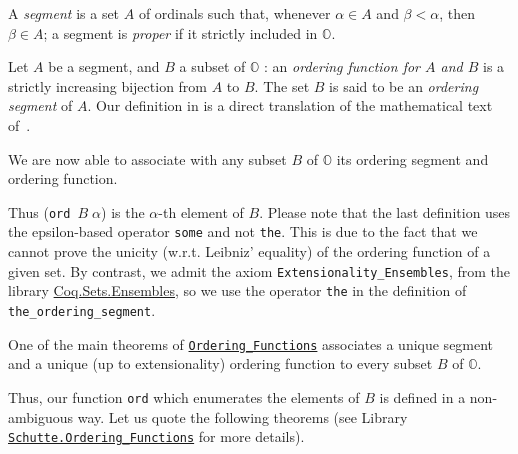 A \emph{segment} is a set $A$ of ordinals such that, whenever  $\alpha\in A$ and
$\beta<\alpha$, then $\beta\in A$; a segment is  \emph{proper} if it strictly included in $\mathbb{O}$.




Let  $A$ be a segment, and $B$ a subset of $\mathbb{O}$ : an \emph{ordering function for $A$ and  $B$} is a strictly increasing bijection from $A$ to $B$.
The set $B$ is said to be an \emph{ordering segment} of $A$.
Our definition in \coq{} is a direct translation of the mathematical text of~\cite{schutte}.




We are now able to associate with any subset $B$ of $\mathbb{O}$ its ordering segment and ordering function.




Thus (\texttt{ord $B \;\alpha$}) is the $\alpha$-th element of $B$.
Please note that the last definition uses the epsilon-based operator \texttt{some} and
not \texttt{the}. This is due to the fact that we cannot prove the unicity (w.r.t. Leibniz' equality) of the ordering function of a given set. 
By contrast, we admit the axiom  \texttt{Extensionality\_Ensembles}, from the library 
\href{https://coq.inria.fr/distrib/current/stdlib/Coq.Sets.Ensembles.html}{Coq.Sets.Ensembles}, so we use the operator \texttt{the} in the definition of
\texttt{the\_ordering\_segment}.

One of the main theorems of
\href{../theories/html/hydras.Schutte.Ordering_Functions.html\#ordering_function_ex}%
{\texttt{Ordering\_Functions}} 
associates a unique segment and a unique (up to extensionality) ordering function to every subset $B$ of $\mathbb{O}$.



Thus,  our function \texttt{ord}  which enumerates the elements of $B$ is defined in a non-ambiguous way.
Let us quote the following theorems (see Library
\href{../theories/html/hydras.Schutte.Ordering_Functions.html}%
{\texttt{Schutte.Ordering\_Functions}} for more details).
 




